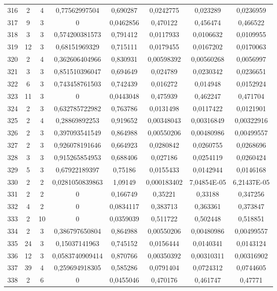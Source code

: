 \begin{longtable}{|c|c|c|c|c|c|c|c|}
316 & 2 & 4 & 0,77562997504 & 0,690287 & 0,0242775 & 0,023289 & 0,0236959  \\
317 & 9 & 3 & 0 & 0,0462856 & 0,470122 & 0,456474 & 0,466522  \\
318 & 3 & 3 & 0,574200381573 & 0,791412 & 0,0117933 & 0,0106632 & 0,0109955  \\
319 & 12 & 3 & 0,68151969329 & 0,715111 & 0,0179455 & 0,0167202 & 0,0170063  \\
320 & 2 & 4 & 0,362606404966 & 0,830931 & 0,00598392 & 0,00560268 & 0,0056997  \\
321 & 3 & 3 & 0,851510396047 & 0,694649 & 0,024789 & 0,0230342 & 0,0236651  \\
322 & 6 & 3 & 0,743458761503 & 0,742439 & 0,016272 & 0,014948 & 0,0152924  \\
323 & 11 & 3 & 0 & 0,0443048 & 0,475939 & 0,462247 & 0,471704  \\
324 & 2 & 3 & 0,632785722982 & 0,763786 & 0,0131498 & 0,0117422 & 0,0121901  \\
325 & 2 & 4 & 0,28869892253 & 0,919652 & 0,00348043 & 0,00316849 & 0,00322916  \\
326 & 2 & 3 & 0,397093541549 & 0,864988 & 0,00550206 & 0,00480986 & 0,00499557  \\
327 & 2 & 3 & 0,926078191646 & 0,664923 & 0,0280842 & 0,0260755 & 0,0268696  \\
328 & 3 & 3 & 0,915265854953 & 0,688406 & 0,027186 & 0,0254119 & 0,0260424  \\
329 & 5 & 3 & 0,67922189397 & 0,75186 & 0,0155433 & 0,0142944 & 0,0146168  \\
330 & 2 & 2 & 0,0281050839863 & 1,09149 & 0,000183402 & 7,04854E-05 & 6,21437E-05  \\
331 & 2 & 2 & 0 & 0,166749 & 0,35221 & 0,33188 & 0,347256  \\
332 & 4 & 2 & 0 & 0,0834117 & 0,383713 & 0,363361 & 0,373847  \\
333 & 2 & 10 & 0 & 0,0359039 & 0,511722 & 0,502448 & 0,518851  \\
334 & 2 & 3 & 0,386797650804 & 0,864988 & 0,00550206 & 0,00480986 & 0,00499557  \\
335 & 24 & 3 & 0,15037141963 & 0,745152 & 0,0156444 & 0,0140341 & 0,0143124  \\
336 & 12 & 3 & 0,0583740909414 & 0,870766 & 0,00350392 & 0,00310311 & 0,00316902  \\
337 & 39 & 4 & 0,259694918305 & 0,585286 & 0,0791404 & 0,0724312 & 0,0744605  \\
338 & 2 & 6 & 0 & 0,0455046 & 0,470176 & 0,461747 & 0,47771  \\

\end{longtable}
